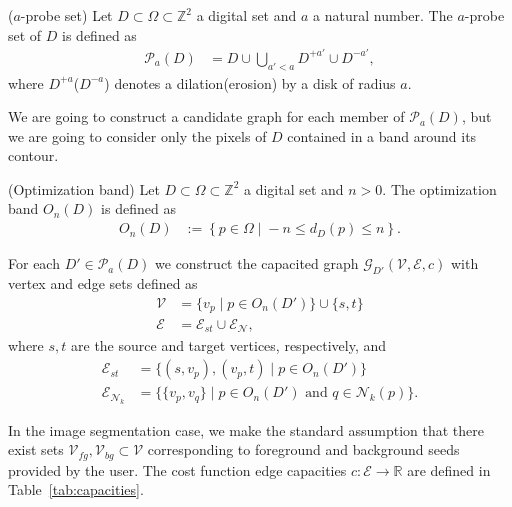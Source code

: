 \documentclass[runningheads]{llncs}
\newcommand{\Ds}{D}
\begin{document}
\begin{definition}{($a$-probe set)}
	Let $\Ds \subset \Omega \subset \mathbb{Z}^2$ a digital set and $a$ a natural number. The $a$-probe set of $\Ds$ is defined as
	\begin{align*}
		\mathcal{P}_a(\Ds) &= \Ds \cup \bigcup_{a' < a}{\Ds^{+a'} \cup \Ds^{-a'}},
	\end{align*}
	where $\Ds^{+a}$($\Ds^{-a}$) denotes a dilation(erosion) by a disk of radius $a$.
\end{definition}
%
%
We are going to construct a candidate graph for each member of $\mathcal{P}_a(D)$, but we are going to consider only the
pixels of $D$ contained in a band around its contour.
%
%
\begin{definition}{(Optimization band)}
Let $\Ds \subset \Omega \subset \mathbb{Z}^2$ a digital set and $n>0$. The optimization band $O_n(\Ds)$ is defined as
\begin{align*}
	O_n(\Ds) &:=\left\{ p \in \Omega \; | \; -n \leq d_{\Ds}(p) \leq n \right\}.
\end{align*}
\end{definition}
%
%
For each $D' \in \mathcal{P}_a(D)$ we construct the capacited graph $\mathcal{G}_{D'}(\mathcal{V},\mathcal{E},c)$ with
vertex and edge sets defined as
\begin{align*}
	\mathcal{V} &= \{ v_p \; | \; p \in O_n(D') \} \cup \{s,t\} \\
	\mathcal{E} &= \mathcal{E}_{st} \cup \mathcal{E}_\mathcal{N},
\end{align*}
where $s,t$ are the source and target vertices, respectively, and
\begin{align*}
	\mathcal{E}_{st} &= \{ (s,v_p), (v_p,t) \; | \; p \in O_n(D') \} \\
	\mathcal{E}_{\mathcal{N}_k} &= \{ \{v_p, v_q\} \; | \; p \in O_n(D') \text{ and } q \in \mathcal{N}_k(p) \}.	
\end{align*}

In the image segmentation case, we make the standard assumption that there exist sets $\mathcal{V}_{fg},\mathcal{V}_{bg} \subset \mathcal{V}$
corresponding to foreground and background seeds provided by the user. The cost function edge capacities
$c:\mathcal{E}\rightarrow \mathbb{R}$ are defined in Table~\ref{tab:capacities}.
\end{document}
